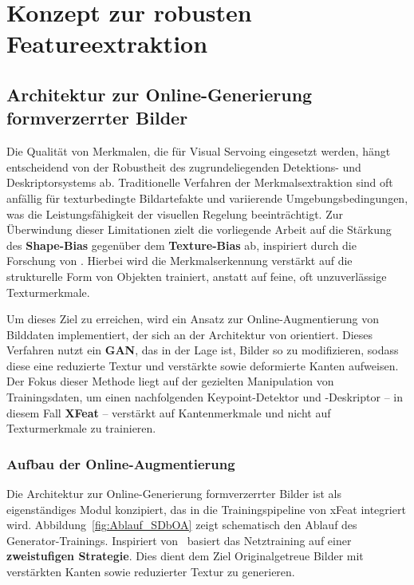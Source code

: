\chapter{Konzept zur robusten Featureextraktion}
\label{ch:SDbOA}





\section{Architektur zur Online-Generierung formverzerrter Bilder}
\label{SDbOA}

Die Qualität von Merkmalen, die für Visual Servoing eingesetzt werden, hängt entscheidend von der Robustheit des zugrundeliegenden Detektions- und Deskriptorsystems ab. Traditionelle Verfahren der Merkmalsextraktion sind oft anfällig für texturbedingte Bildartefakte und variierende Umgebungsbedingungen, was die Leistungsfähigkeit der visuellen Regelung beeinträchtigt. Zur Überwindung dieser Limitationen zielt die vorliegende Arbeit auf die Stärkung des \textbf{Shape-Bias} gegenüber dem \textbf{Texture-Bias} ab, inspiriert durch die Forschung von \textcite{Zhang_2023_arXiv}. Hierbei wird die Merkmalserkennung verstärkt auf die strukturelle Form von Objekten trainiert, anstatt auf feine, oft unzuverlässige Texturmerkmale.

Um dieses Ziel zu erreichen, wird ein Ansatz zur Online-Augmentierung von Bilddaten implementiert, der sich an der Architektur von \textcite{He_2023_ICCV} orientiert. Dieses Verfahren nutzt ein \textbf{\ac{GAN}}, das in der Lage ist, Bilder so zu modifizieren, sodass diese eine reduzierte Textur und verstärkte sowie deformierte Kanten aufweisen. Der Fokus dieser Methode liegt auf der gezielten Manipulation von Trainingsdaten, um einen nachfolgenden Keypoint-Detektor und -Deskriptor – in diesem Fall \textbf{XFeat} – verstärkt auf Kantenmerkmale und nicht auf Texturmerkmale zu trainieren.




\subsection{Aufbau der Online-Augmentierung}
\label{sec:Aufbau_SDbOA}
 
Die Architektur zur Online-Generierung formverzerrter Bilder ist als eigenständiges Modul konzipiert, das in die Trainingspipeline von \ac{xFeat} integriert wird. Abbildung~\ref{fig:Ablauf_SDbOA} zeigt schematisch den Ablauf des Generator-Trainings. Inspiriert von~\textcite{He_2023_ICCV} basiert das Netztraining auf einer \textbf{zweistufigen Strategie}. Dies dient dem Ziel Originalgetreue Bilder mit verstärkten Kanten sowie reduzierter Textur zu generieren.

